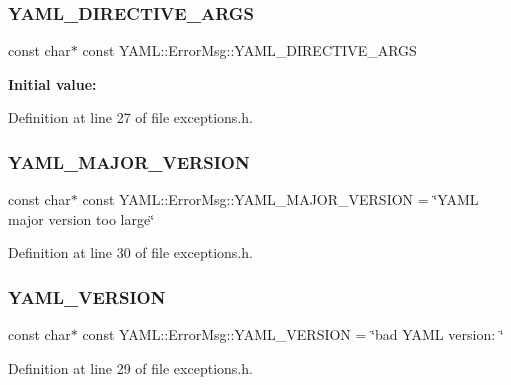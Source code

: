 \subsubsection{\texorpdfstring{YAML\_DIRECTIVE\_ARGS}{YAML\_DIRECTIVE\_ARGS}}
{\footnotesize\ttfamily const char$\ast$ const Y\+A\+M\+L\+::\+Error\+Msg\+::\+Y\+A\+M\+L\+\_\+\+D\+I\+R\+E\+C\+T\+I\+V\+E\+\_\+\+A\+R\+GS}

{\bfseries Initial value\+:}
\begin{DoxyCode}{0}
\DoxyCodeLine{=}
\DoxyCodeLine{    \textcolor{stringliteral}{"YAML directives must have exactly one argument"}}

\end{DoxyCode}


Definition at line 27 of file exceptions.\+h.

\mbox{\label{namespace_y_a_m_l_1_1_error_msg_ad1b6b0d991e09c1ad42e704f13d45e2c}} 
\subsubsection{\texorpdfstring{YAML\_MAJOR\_VERSION}{YAML\_MAJOR\_VERSION}}
{\footnotesize\ttfamily const char$\ast$ const Y\+A\+M\+L\+::\+Error\+Msg\+::\+Y\+A\+M\+L\+\_\+\+M\+A\+J\+O\+R\+\_\+\+V\+E\+R\+S\+I\+ON = \char`\"{}Y\+A\+ML major version too large\char`\"{}}



Definition at line 30 of file exceptions.\+h.

\mbox{\label{namespace_y_a_m_l_1_1_error_msg_a6e7998d0efedc5cab142baaa7c9bffba}} 
\subsubsection{\texorpdfstring{YAML\_VERSION}{YAML\_VERSION}}
{\footnotesize\ttfamily const char$\ast$ const Y\+A\+M\+L\+::\+Error\+Msg\+::\+Y\+A\+M\+L\+\_\+\+V\+E\+R\+S\+I\+ON = \char`\"{}bad Y\+A\+ML version\+: \char`\"{}}



Definition at line 29 of file exceptions.\+h.

